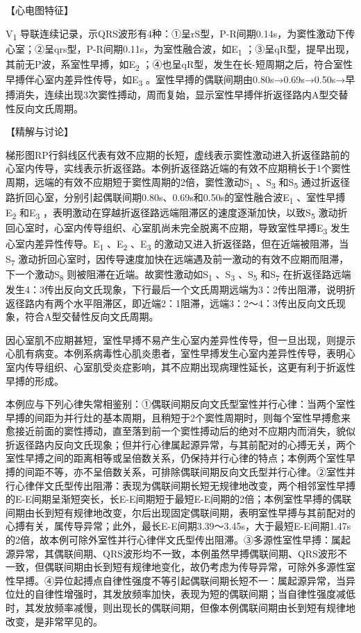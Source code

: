 【心电图特征】

V\textsubscript{1}
导联连续记录，示QRS波形有4种：①呈rS型，P-R间期0.14s，为窦性激动下传心室；②呈qrs型，P-R间期0.11s，为室性融合波，如E\textsubscript{1}
；③呈qR型，提早出现，其前无P波，系室性早搏，如E\textsubscript{2}
；④也呈qR型，发生在长-短周期之后，符合室性早搏伴心室内差异性传导，如E\textsubscript{3}
。室性早搏的偶联间期由0.80s→0.69s→0.50s→早搏消失，连续出现3次窦性搏动，周而复始，显示室性早搏伴折返径路内A型交替性反向文氏周期。

【精解与讨论】

梯形图RP行斜线区代表有效不应期的长短，虚线表示窦性激动进入折返径路前的心室内传导，实线表示折返径路。本例折返径路近端的有效不应期稍长于1个窦性周期，远端的有效不应期短于窦性周期的2倍，窦性激动S\textsubscript{1}
、S\textsubscript{3} 和S\textsubscript{5}
通过折返径路折回心室，分别引起偶联间期0.80s、0.69s和0.50s的室性融合波E\textsubscript{1}
、室性早搏E\textsubscript{2} 和E\textsubscript{3}
，表明激动在穿越折返径路远端阻滞区的速度逐渐加快，以致S\textsubscript{5}
激动折回心室时，心室内传导组织、心室肌尚未完全脱离不应期，导致室性早搏E\textsubscript{3}
发生心室内差异性传导。E\textsubscript{1} 、E\textsubscript{2}
、E\textsubscript{3}
的激动又进入折返径路，但在近端被阻滞，当S\textsubscript{7}
激动折回心室时，因传导速度加快在远端遇及前一激动的有效不应期而阻滞，下一个激动S\textsubscript{8}
则被阻滞在近端。故窦性激动如S\textsubscript{1} 、S\textsubscript{3}
、S\textsubscript{5} 和S\textsubscript{7}
在折返径路远端发生4：3传出反向文氏现象，下行最后一个文氏周期远端为3：2传出阻滞，说明折返径路内有两个水平阻滞区，即近端2：1阻滞，远端3：2～4：3传出反向文氏现象，符合A型交替性反向文氏周期。

因心室肌不应期甚短，室性早搏不易产生心室内差异性传导，但一旦出现，则提示心肌有病变。本例系病毒性心肌炎患者，室性早搏发生心室内差异性传导，表明心室内传导组织、心室肌受炎症影响，其不应期出现病理性延长，这更有利于折返性早搏的形成。

本例应与下列心律失常相鉴别：①偶联间期反向文氏型室性并行心律：当两个室性早搏的间距为并行灶的基本周期，且稍短于2个窦性周期时，则每个室性早搏愈来愈接近前面的窦性搏动，直至落到前一个窦性搏动后的绝对不应期内而消失，貌似折返径路内反向文氏现象；但并行心律属起源异常，与其前配对的心搏无关，两个室性早搏之间的距离相等或呈倍数关系，仍保持并行心律的特点；本例两个室性早搏的间距不等，亦不呈倍数关系，可排除偶联间期反向文氏型并行心律。②室性并行心律伴文氏型传出阻滞：表现为偶联间期长短无规律地改变，两个相邻室性早搏的E-E间期呈渐短突长，长E-E间期短于最短E-E间期的2倍；本例室性早搏的偶联间期由长到短有规律地改变，尔后出现固定偶联间期，表明室性早搏与其前配对的心搏有关，属传导异常；此外，最长E-E间期3.39～3.45s，大于最短E-E间期1.47s的2倍，故本例可除外室性并行心律伴文氏型传出阻滞。③多源性室性早搏：属起源异常，其偶联间期、QRS波形均不一致，本例虽然早搏偶联间期、QRS波形不一致，但偶联间期由长到短有规律地变化，故仍考虑为传导异常，可除外多源性室性早搏。④异位起搏点自律性强度不等引起偶联间期长短不一：属起源异常，当异位灶的自律性增强时，其发放频率加快，表现为短的偶联间期；当自律性强度减低时，其发放频率减慢，则出现长的偶联间期，但像本例偶联间期由长到短有规律地改变，是非常罕见的。

